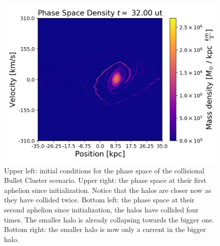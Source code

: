 \begin{figure}[h!]
    \includegraphics[scale=0.45]{imag/cBulletPhase80.png}
    \caption{Upper left: initial conditions for the phase space of the collisional Bullet Cluster scenario. Upper right: the phase space at their first aphelion since initialization. Notice that the halos are closer now as they have collided twice.  Bottom left: the phase space at their second aphelion since initialization, the halos have collided four times. The smaller halo is already collapsing towards the bigger one. Bottom right: the smaller halo is now only a current in the bigger halo.}
    \label{phaseColGauss}
\end{figure}

